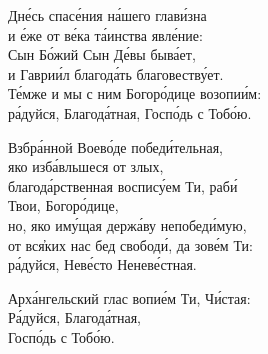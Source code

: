 \documentclass{article}
\begin{document}
%
Дне́сь спасе́ния на́шего глави́зна \\
и е́же от ве́ка та́инства явле́ние: \\
Сын Бо́жий Сын Де́вы быва́ет, \\
и Гаврии́л благода́ть благовеству́ет. \\
Те́мже и мы с ним Богоро́дице возопии́м: \\
ра́дуйся, Благода́тная, Госпо́дь с Тобо́ю.

Взбра́нной Воево́де победи́тельная, \\
яко изба́вльшеся от злых, \\
благода́рственная воспису́ем Ти, раби́ \\
\cont Твои, Богоро́дице, \\
но, яко иму́щая держа́ву непобеди́мую, \\
от вся҆ких нас бед свободи́, да зове́м Ти: \\
ра́дуйся, Неве́сто Неневе́стная.

Арха́нгельский глас вопие́м Ти, Чи́стая: \\
Ра́дуйся, Благода́тная, \\
Госпо́дь с Тобо́ю.
\end{document}
